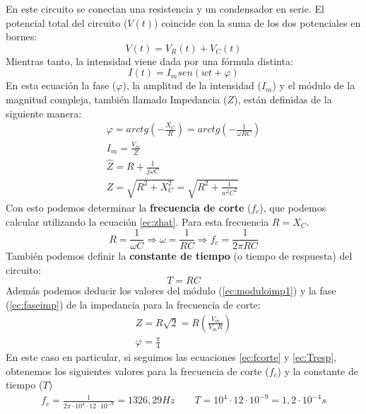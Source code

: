\documentclass[12pt, a4paper, titlepage]{article}
\begin{document}
  En este circuito se conectan una resistencia y un condensador en serie. El potencial total del circuito ($V(t)$) coincide con la suma de los dos potenciales en bornes:
  \begin{equation}
    V(t) = V_R(t) + V_C(t)
  \end{equation}
  Mientras tanto, la intensidad viene dada por una fórmula distinta:
  \begin{equation}
    I(t) = I_m sen(wt + \varphi)
  \end{equation}
  En esta ecuación la fase ($\varphi$), la amplitud de la intensidad ($I_m$) y el módulo de la magnitud compleja, también llamado Impedancia ($Z$), están definidas de la siguiente manera:
  \begin{gather}
    \varphi = arctg\left(-\frac{X_C}{R}\right) = arctg\left(-\frac{1}{\omega RC}\right) \label{ec:faseimp} \\
    I_m = \frac{V_m}{Z} \\
    \hat{Z} = R + \frac{1}{j\omega C} \label{ec:zhat} \\
    Z = \sqrt{R^2+X_C^2} = \sqrt{R^2+\frac{1}{w^2C^2}} \label{ec:moduloimp1}
  \end{gather}
  Con esto podemos determinar la \textbf{frecuencia de corte} ($f_c$), que podemos calcular utilizando la ecuación \ref{ec:zhat}. Para esta frecuencia $R = X_C$.
  \begin{equation}
    R = \frac{1}{\omega C} \Rightarrow \omega = \frac{1}{RC} \Rightarrow f_c = \frac{1}{2\pi RC} \label{ec:fcorte}
  \end{equation}
  También podemos definir la \textbf{constante de tiempo} (o tiempo de respuesta) del circuito:
  \begin{equation}
    T = RC \label{ec:Tresp}
  \end{equation}
  Además podemos deducir los valores del módulo (\ref{ec:moduloimp1}) y la fase (\ref{ec:faseimp}) de la impedancia para la frecuencia de corte:
  \begin{gather}
    Z = R\sqrt{2} = R\left(\frac{V_m}{V_mR}\right) \label{ec:moduloimp2} \\ \varphi = \frac{\pi}{4} \nonumber
  \end{gather}
  En este caso en particular, si seguimos las ecuaciones \ref{ec:fcorte} y \ref{ec:Tresp}, obtenemos los siguientes valores para la frecuencia de corte ($f_c$) y la constante de tiempo ($T$)
  \begin{gather}
    f_c = \frac{1}{2\pi \cdot 10^4 \cdot 12 \cdot 10^{-9}} = 1326,29 Hz \qquad T = 10^4 \cdot 12 \cdot 10^{-9} = 1,2 \cdot 10^{-4} s \nonumber
  \end{gather}
\end{document}

